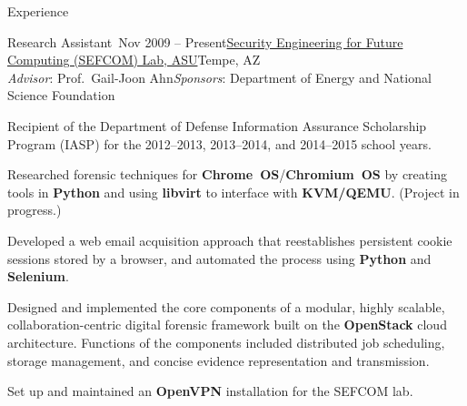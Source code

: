 \documentclass{resume} %
\begin{document}
\begin{rSection}{Experience}


\begin{rExperienceBullets}{Research Assistant~}{Nov 2009 -- Present}{\href{http://sefcom.asu.edu/}{Security Engineering for Future Computing (SEFCOM) Lab, ASU}}{Tempe, AZ\\{\textnormal{\textit{Advisor}: Prof.\ Gail-Joon Ahn\hfill \textit{Sponsors}: Department of Energy and National Science Foundation}}}

	\item Recipient of the Department of Defense Information Assurance Scholarship Program (IASP) for the 2012--2013, 2013--2014, and 2014--2015 school years.

	\item Researched forensic techniques for \textbf{Chrome~OS}/\textbf{Chromium~OS} by creating tools in \textbf{Python} and using \textbf{libvirt} to interface with \textbf{KVM/QEMU}. (Project in progress.)

	\item Developed a web email acquisition approach that reestablishes persistent cookie sessions stored by a browser, and automated the process using \textbf{Python} and \textbf{Selenium}.

	\item Designed and implemented the core components of a modular, highly scalable, collaboration-centric digital forensic framework built on the \textbf{OpenStack} cloud architecture. Functions of the components included distributed job scheduling, storage management, and concise evidence representation and transmission.

	\item Set up and maintained an \textbf{OpenVPN} installation for the SEFCOM lab.




\end{rExperienceBullets}
\end{rSection}
\end{document}
